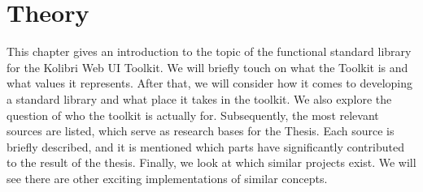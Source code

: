 \chapter{Theory}
This chapter gives an introduction to the topic of the functional standard
library for the Kolibri Web UI Toolkit. We will briefly touch on what the 
Toolkit is and what values it represents. After that, we will consider how it
comes to developing a standard library and what place it takes in the
toolkit. We also explore the question of who the toolkit is actually for.
\newline
Subsequently, the most relevant sources are listed, which serve as research bases for the Thesis.
Each source is briefly described, and it is mentioned which parts have significantly 
contributed to the result of the thesis.
\newline
Finally, we look at which similar projects exist. We will see there are other
exciting implementations of similar concepts.



